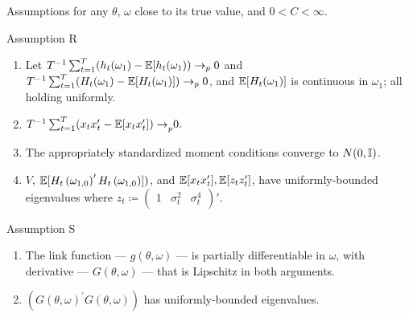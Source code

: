\documentclass[smaller, aspectratio=169]{beamer}
\begin{document}
\begin{frame}[c]{Assumptions for any $\theta$, $\omega$ close to its true value, and $ 0 < C < \infty$.}

  \begin{block}{Assumption R}
    \label{assump:R}
%    
    \begin{enumerate}
      \item Let $T^{-1}\sum_{t=1}^{T}(h_{t}(\omega_{1})-\mathbb{E}[ h_{t}(\omega_{1}))\rightarrow_{p}0$ and $T^{-1}\sum_{t=1}^{T}(H_{t}(\omega_{1})-\mathbb{E}[H_{t}(\omega_{1})])\rightarrow_{p}0$, and $\mathbb{E}[H_{t}(\omega_{1})]$ is continuous in $\omega_{1}$; all holding uniformly.
%
      \item $T^{-1}\sum_{t=1}^{T}(x_{t}x_{t}^{\prime}-\mathbb{E}[ x_{t}x_{t}^{\prime}{])\rightarrow}_{p}0.$
%
      \item The appropriately standardized moment conditions converge to $N(0, \mathbb{I})$.
%
  \item $V$, $\mathbb{E}[H_{t}\left(\omega_{1, 0}\right)^{\prime}H_{t}\left(\omega_{1, 0}\right) ])$, and $\mathbb{E}[x_{t}x_{t}^{\prime}], \mathbb{E}[ z_{t}z_{t}^{\prime}]$,  have uniformly-bounded eigenvalues where $z_{t} \coloneqq \begin{pmatrix} 1 & \sigma_{t}^{2} & \sigma_{t}^{4} \end{pmatrix}'$.
%
    \end{enumerate}
  \end{block}
  
  \vfill

  \begin{block}{Assumption S}
%
    \begin{enumerate}
      \item The link function --- $g(\theta, \omega)$ --- is partially differentiable in $\omega$, with derivative --- $G(\theta, \omega)$ --- that is Lipschitz in both arguments. 
      \item $(G(\theta, \omega)^{\prime}G(\theta, \omega))$ has uniformly-bounded eigenvalues.
    \end{enumerate}

  \end{block}

\end{frame}
\end{document}
